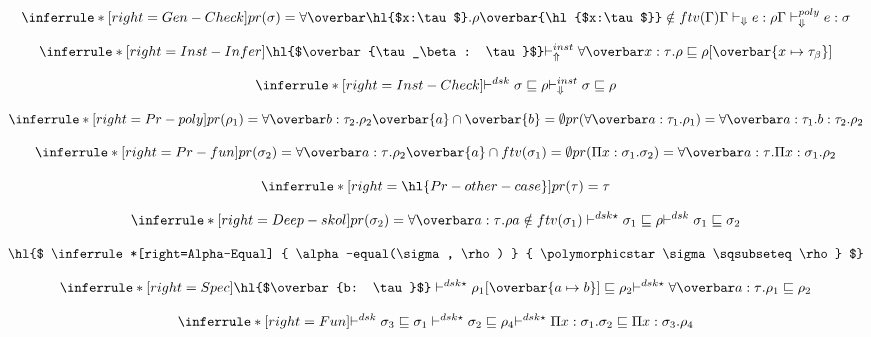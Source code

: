 \[
\inferrule*[right=Gen-Check]
{
pr(\sigma) = \forallvars{\hl{$x:\tau$}}. \rho \\
\overbar{\hl{$x:\tau$}} \notin ftv(\Gamma) \\
\checktype e :\rho
} {\polycheck e : \sigma}
\]

\framebox{$ \instinfercheck \sigma \sqsubseteq \rho$ }

\[
\inferrule*[right=Inst-Infer]
{\hl{$\overbar{\tau_\beta : \tau}$}}
{\instinfer \forallvars{x:\tau}. \rho \sqsubseteq \rho[\overbar{\tpmapsto {\tau} x {\tau_\beta}}]}
\]

\[
\inferrule*[right=Inst-Check]
{\polymorphic \sigma \sqsubseteq \rho } {\instcheck \sigma \sqsubseteq \rho}
\]


\[
\inferrule*[right=Pr-poly]
{pr(\rho_1) = \forallvars{b:\tau_2}. \rho_2 \\ \overbar{a} \cap \overbar{b} = \emptyset} {pr(\forallvars{a:\tau_1}. \rho_1) = \forallvars{a:\tau_1. b:\tau_2}. \rho_2}
\]

\[
\inferrule*[right=Pr-fun]
{pr(\sigma_2) = \forallvars{a:\tau}. \rho_2 \\ \overbar{a} \cap ftv(\sigma_1) = \emptyset} {pr(\Pi x:\sigma_1. \sigma_2) = \forallvars{a:\tau}. \Pi x:\sigma_1. \rho_2}
\]

\[
\inferrule*[right=\hl{Pr-other-case}]
{  } {pr(\tau)=\tau}
\]


\[
\inferrule*[right=Deep-skol]
{pr(\sigma_2)=\forallvars{a:\tau}. \rho \\ a \notin ftv(\sigma_1) \\
\polymorphicstar \sigma_1 \sqsubseteq \rho }
{\polymorphic \sigma_1 \sqsubseteq \sigma_2}
\]

\framebox{$\polymorphicstar \sigma \sqsubseteq \rho$}

\[
\hl{$
\inferrule*[right=Alpha-Equal]
{  \alpha-equal(\sigma, \rho)  }
{  \polymorphicstar \sigma \sqsubseteq \rho }
$}
\]

\[
\inferrule*[right=Spec]
{\hl{$\overbar{b: \tau}$} \\
\polymorphicstar \rho_1[\overbar{\tpmapsto \tau a b}] \sqsubseteq \rho_2}
{ \polymorphicstar \forallvars{a:\tau}.\rho_1 \sqsubseteq \rho_2}
\]

\[
\inferrule*[right=Fun]
{\polymorphic  \sigma_3 \sqsubseteq \sigma_1 \\
\polymorphicstar  \sigma_2 \sqsubseteq \rho_4}
{ \polymorphicstar \Pi x:\sigma_1. \sigma_2 \sqsubseteq \Pi x:\sigma_3. \rho_4}
\]


